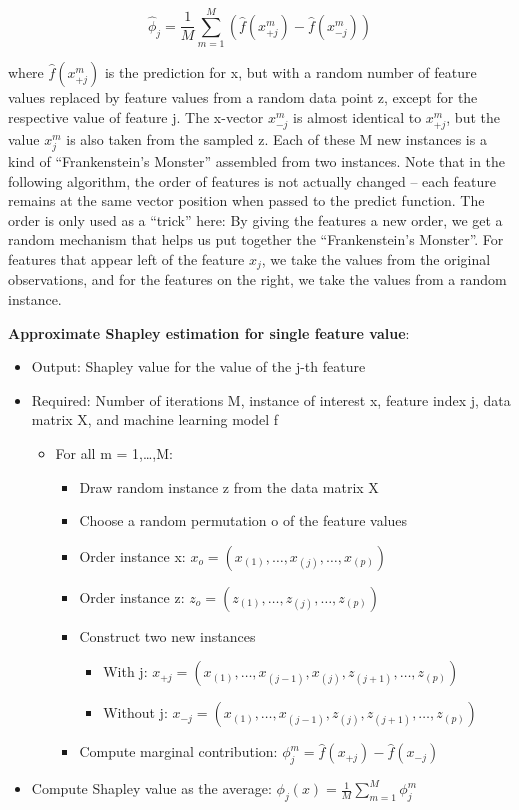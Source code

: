 \documentclass[
  10pt,
]{scrbook}
\providecommand{\tightlist}{%
  \setlength{\itemsep}{0pt}\setlength{\parskip}{0pt}}
\begin{document}
\[\hat{\phi}_{j}=\frac{1}{M}\sum_{m=1}^M\left(\hat{f}(x^{m}_{+j})-\hat{f}(x^{m}_{-j})\right)\]

where \(\hat{f}(x^{m}_{+j})\) is the prediction for x, but with a random number of feature values replaced by feature values from a random data point z, except for the respective value of feature j.
The x-vector \(x^{m}_{-j}\) is almost identical to \(x^{m}_{+j}\), but the value \(x_j^{m}\) is also taken from the sampled z.
Each of these M new instances is a kind of ``Frankenstein's Monster'' assembled from two instances.
Note that in the following algorithm, the order of features is not actually changed -- each feature remains at the same vector position when passed to the predict function.
The order is only used as a ``trick'' here:
By giving the features a new order, we get a random mechanism that helps us put together the ``Frankenstein's Monster''.
For features that appear left of the feature \(x_j\), we take the values from the original observations, and for the features on the right, we take the values from a random instance.

\textbf{Approximate Shapley estimation for single feature value}:

\begin{itemize}
\tightlist
\item
  Output: Shapley value for the value of the j-th feature
\item
  Required: Number of iterations M, instance of interest x, feature index j, data matrix X, and machine learning model f

  \begin{itemize}
  \tightlist
  \item
    For all m = 1,\ldots,M:

    \begin{itemize}
    \tightlist
    \item
      Draw random instance z from the data matrix X
    \item
      Choose a random permutation o of the feature values
    \item
      Order instance x: \(x_o=(x_{(1)},\ldots,x_{(j)},\ldots,x_{(p)})\)
    \item
      Order instance z: \(z_o=(z_{(1)},\ldots,z_{(j)},\ldots,z_{(p)})\)
    \item
      Construct two new instances

      \begin{itemize}
      \tightlist
      \item
        With j: \(x_{+j}=(x_{(1)},\ldots,x_{(j-1)},x_{(j)},z_{(j+1)},\ldots,z_{(p)})\)
      \item
        Without j: \(x_{-j}=(x_{(1)},\ldots,x_{(j-1)},z_{(j)},z_{(j+1)},\ldots,z_{(p)})\)
      \end{itemize}
    \item
      Compute marginal contribution: \(\phi_j^{m}=\hat{f}(x_{+j})-\hat{f}(x_{-j})\)
    \end{itemize}
  \end{itemize}
\item
  Compute Shapley value as the average: \(\phi_j(x)=\frac{1}{M}\sum_{m=1}^M\phi_j^{m}\)
\end{itemize}
\end{document}
